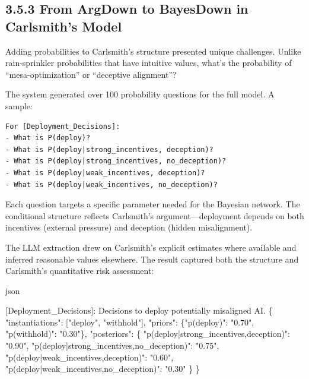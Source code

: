 \documentclass[
  11pt,
  letterpaper,
]{book}
\newenvironment{Shaded}{\begin{snugshade}}{\end{snugshade}}
\newcommand{\DataTypeTok}[1]{\textcolor[rgb]{0.68,0.00,0.00}{#1}}
\newcommand{\ErrorTok}[1]{\textcolor[rgb]{0.68,0.00,0.00}{#1}}
\newcommand{\FunctionTok}[1]{\textcolor[rgb]{0.28,0.35,0.67}{#1}}
\newcommand{\OtherTok}[1]{\textcolor[rgb]{0.00,0.23,0.31}{#1}}
\newcommand{\StringTok}[1]{\textcolor[rgb]{0.13,0.47,0.30}{#1}}
\begin{document}
\subsection{3.5.3 From ArgDown to BayesDown in Carlsmith's
Model}\label{sec-carlsmith-bayesdown}

Adding probabilities to Carlsmith's structure presented unique
challenges. Unlike rain-sprinkler probabilities that have intuitive
values, what's the probability of ``mesa-optimization'' or ``deceptive
alignment''?

The system generated over 100 probability questions for the full model.
A sample:

\begin{verbatim}
For [Deployment_Decisions]:
- What is P(deploy)?
- What is P(deploy|strong_incentives, deception)?
- What is P(deploy|strong_incentives, no_deception)?
- What is P(deploy|weak_incentives, deception)?
- What is P(deploy|weak_incentives, no_deception)?
\end{verbatim}

Each question targets a specific parameter needed for the Bayesian
network. The conditional structure reflects Carlsmith's
argument---deployment depends on both incentives (external pressure) and
deception (hidden misalignment).

The LLM extraction drew on Carlsmith's explicit estimates where
available and inferred reasonable values elsewhere. The result captured
both the structure and Carlsmith's quantitative risk assessment:

json

\begin{Shaded}
\begin{Highlighting}[]
\OtherTok{[}\ErrorTok{Deployment\_Decisions}\OtherTok{]}\ErrorTok{:} \ErrorTok{Decisions} \ErrorTok{to} \ErrorTok{deploy} \ErrorTok{potentially} \ErrorTok{misaligned} \ErrorTok{AI.} \FunctionTok{\{}
  \DataTypeTok{"instantiations"}\FunctionTok{:} \OtherTok{[}\StringTok{"deploy"}\OtherTok{,} \StringTok{"withhold"}\OtherTok{]}\FunctionTok{,}
  \DataTypeTok{"priors"}\FunctionTok{:} \FunctionTok{\{}\DataTypeTok{"p(deploy)"}\FunctionTok{:} \StringTok{"0.70"}\FunctionTok{,} \DataTypeTok{"p(withhold)"}\FunctionTok{:} \StringTok{"0.30"}\FunctionTok{\},}
  \DataTypeTok{"posteriors"}\FunctionTok{:} \FunctionTok{\{}
    \DataTypeTok{"p(deploy|strong\_incentives,deception)"}\FunctionTok{:} \StringTok{"0.90"}\FunctionTok{,}
    \DataTypeTok{"p(deploy|strong\_incentives,no\_deception)"}\FunctionTok{:} \StringTok{"0.75"}\FunctionTok{,}
    \DataTypeTok{"p(deploy|weak\_incentives,deception)"}\FunctionTok{:} \StringTok{"0.60"}\FunctionTok{,}
    \DataTypeTok{"p(deploy|weak\_incentives,no\_deception)"}\FunctionTok{:} \StringTok{"0.30"}
  \FunctionTok{\}}
\FunctionTok{\}}
\end{Highlighting}
\end{Shaded}
\end{document}
